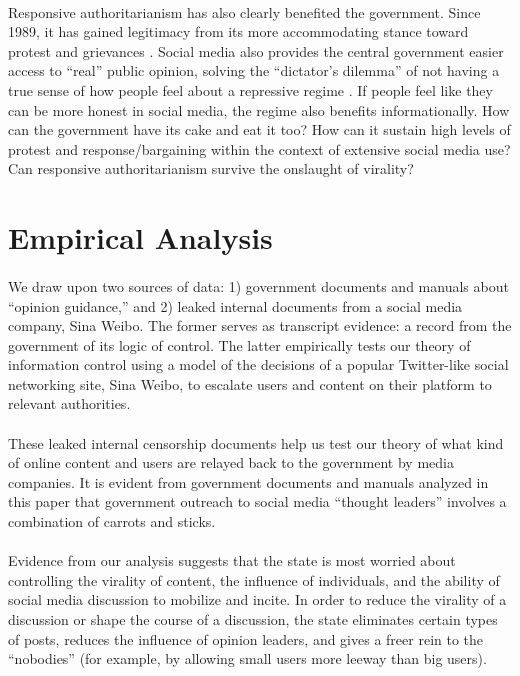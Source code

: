 \documentclass[12pt]{article}
\begin{document}
\begin{CJK*}{UTF8}{gbsn}
\paragraph{} Responsive authoritarianism has also clearly benefited the government. Since 1989, it has gained legitimacy from its more accommodating stance toward protest and grievances \citep{dickson2016dictator,tang2016populist}. Social media also provides the central government easier access to ``real'' public opinion, solving the ``dictator's dilemma'' of not having a true sense of how people feel about a repressive regime \citep{wintrobe2000political}. If people feel like they can be more honest in social media, the regime also benefits informationally. How can the government have its cake and eat it too? How can it sustain high levels of protest and response/bargaining within the context of extensive social media use? Can responsive authoritarianism survive the onslaught of virality?

\section{Empirical Analysis}

\paragraph{} We draw upon two sources of data: 1) government documents and manuals about ``opinion guidance,'' and 2) leaked internal documents from a social media company, Sina Weibo. The former serves as transcript evidence: a record from the government of its logic of control. The latter empirically tests our theory of information control using a model of the decisions of a popular Twitter-like social networking site, Sina Weibo, to escalate users and content on their platform to relevant authorities.
\paragraph{} These leaked internal censorship documents help us test our theory of what kind of online content and users are relayed back to the government by media companies. It is evident from government documents and manuals analyzed in this paper that government outreach to social media ``thought leaders'' involves a combination of carrots and sticks.
\paragraph{} Evidence from our analysis suggests that the state is most worried about controlling the virality of content, the influence of individuals, and the ability of social media discussion to mobilize and incite. In order to reduce the virality of a discussion or shape the course of a discussion, the state eliminates certain types of posts, reduces the influence of opinion leaders, and gives a freer rein to the ``nobodies'' (for example, by allowing small users more leeway than big users).


\end{CJK*}
\end{document}
